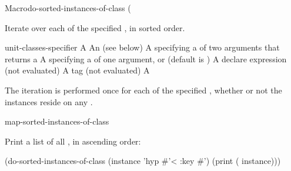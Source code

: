 \documentclass[10pt,twoside,english,pdftex]{article}
\begin{document}

\begin{functiondoc}{Macro}{do-sorted-instances-of-class}%
  {( 
    }
%
%

\fnsyntax

\fnpurpose Iterate over each  of the specified
, in sorted order.

\fnpackage {}

\fnmodule {}

\fnargs
\begin{args}{unit-classes-specifier}
\arg[var] A 
 An 
(see below)
\arg[predicate] A  specifying a
 of two arguments that returns a
\arg[key] A  specifying a 
of one argument, or \nil{} (default is \nil)
\arg[declaration] A declare expression (not evaluated)
\arg[tag] A  tag (not evaluated)
\arg[form] A 
\end{args}

\fndsyntax
\W\supp\tabletop
\unitclassesspec
\subclassingspec

\fndescription The iteration is performed once for each 
of the specified , whether or not the instances reside on
any .

\begin{alsos}{map-sorted-instances-of-class}
\end{alsos}

\fnexample
Print a list of all  , in ascending order:
%
\W\supp
\begin{example}
  (do-sorted-instances-of-class (instance 'hyp #'< :key #')
     (print ( instance)))
\end{example} 

\end{functiondoc}
\end{document}
